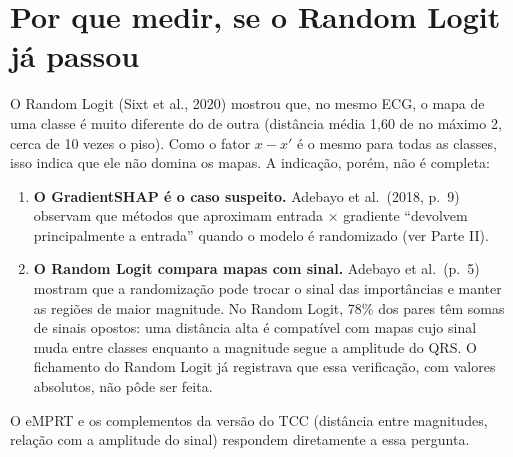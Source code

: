 \documentclass[11pt,a4paper]{article}
\begin{document}
\section{Por que medir, se o Random Logit já passou}\label{sec:porque}
O Random Logit (Sixt et al., 2020) mostrou que, no mesmo ECG, o mapa de uma classe é muito diferente do de outra (distância média 1,60 de no máximo 2, cerca de 10 vezes o piso). Como o fator $x - x'$ é o mesmo para todas as classes, isso indica que ele não domina os mapas. A indicação, porém, não é completa:
\begin{enumerate}
\item \textbf{O GradientSHAP é o caso suspeito.} Adebayo et al.\ (2018, p.~9) observam que métodos que aproximam entrada $\times$ gradiente “devolvem principalmente a entrada” quando o modelo é randomizado (ver Parte II).
\item \textbf{O Random Logit compara mapas com sinal.} Adebayo et al.\ (p.~5) mostram que a randomização pode trocar o sinal das importâncias e manter as regiões de maior magnitude. No Random Logit, 78\% dos pares têm somas de sinais opostos: uma distância alta é compatível com mapas cujo sinal muda entre classes enquanto a magnitude segue a amplitude do QRS. O fichamento do Random Logit já registrava que essa verificação, com valores absolutos, não pôde ser feita.
\end{enumerate}
O eMPRT e os complementos da versão do TCC (distância entre magnitudes, relação com a amplitude do sinal) respondem diretamente a essa pergunta.
\end{document}
